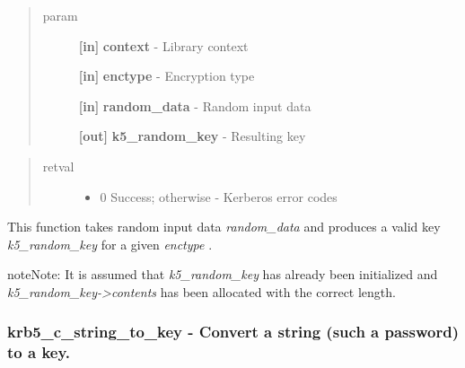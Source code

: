 \documentclass[letterpaper,10pt,english]{sphinxmanual}
\begin{document}
\begin{quote}\begin{description}
\item[{param}] \leavevmode
\textbf{{[}in{]}} \textbf{context} - Library context

\textbf{{[}in{]}} \textbf{enctype} - Encryption type

\textbf{{[}in{]}} \textbf{random\_data} - Random input data

\textbf{{[}out{]}} \textbf{k5\_random\_key} - Resulting key

\end{description}\end{quote}
\begin{quote}\begin{description}
\item[{retval}] \leavevmode\begin{itemize}
\item {} 
0   Success; otherwise - Kerberos error codes

\end{itemize}

\end{description}\end{quote}

This function takes random input data \emph{random\_data} and produces a valid key \emph{k5\_random\_key} for a given \emph{enctype} .




{\hyperref[appdev/refs/api/krb5_c_keylengths:krb5_c_keylengths]{}}



\begin{notice}{note}{Note:}
It is assumed that \emph{k5\_random\_key} has already been initialized and \emph{k5\_random\_key-\textgreater{}contents} has been allocated with the correct length.
\end{notice}


\subsubsection{krb5\_c\_string\_to\_key -  Convert a string (such a password) to a key.}
\label{appdev/refs/api/krb5_c_string_to_key:krb5-c-string-to-key-convert-a-string-such-a-password-to-a-key}\label{appdev/refs/api/krb5_c_string_to_key::doc}

\begin{fulllineitems}
\label{appdev/refs/api/krb5_c_string_to_key:krb5_c_string_to_key}
\end{fulllineitems}
\end{document}
